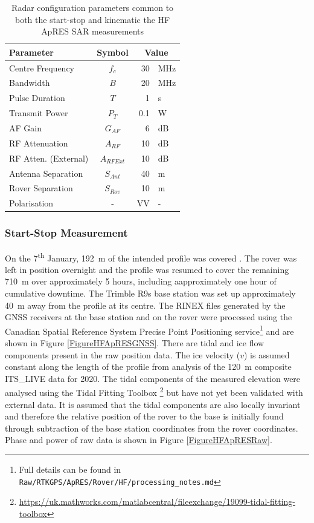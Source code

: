 \documentclass[a4paper,12pt]{article}
\begin{document}
\begin{table}[h]
  \centering\begin{tabular}{l c r l}
    \hline
    \rowcolor{gray!50}
    Parameter & Symbol & \multicolumn{2}{c}{Value} \\
    \hline
    Centre Frequency & $f_c$ & 30 & \si{\mega\hertz} \\
    Bandwidth & $B$ & 20 & \si{\mega\hertz} \\
    Pulse Duration & $T$ & 1 & \si{\second} \\
    Transmit Power & $P_T$ & 0.1 & \si{\watt} \\
    AF Gain & $G_{AF}$ & 6 & \si{\deci\bel} \\
    RF Attenuation & $A_{RF}$ & 10 & \si{\deci\bel} \\
    RF Atten. (External) & $A_{RFExt}$ & 10 &  \si{\deci\bel} \\
    Antenna Separation & $S_{Ant}$ & 40 & \si{\metre} \\
    Rover Separation & $S_{Rov}$ & 10 & \si{\metre} \\
    Polarisation & - & VV & - \\
    \hline
    
  \end{tabular}
  \caption{Radar configuration parameters common to both the start-stop and
  kinematic the HF ApRES SAR measurements}
  \label{TableHFApRESMeasurementParams}
\end{table}

\subsubsection{Start-Stop Measurement}
On the 7\textsuperscript{th} January, \SI{192}{\metre} of the intended profile
was covered .  The rover was left in position overnight and the profile was
resumed to cover the remaining \SI{710}{\metre} over approximately 5 hours,
including aapproximately one hour of cumulative downtime. The Trimble R9s base
station was set up approximately \SI{40}{\metre} away from the profile at its
centre.  The RINEX files generated by the GNSS receivers at the base station and
on the rover were processed using the Canadian Spatial Reference System Precise
Point Positioning service\footnote{Full details can be found in
\texttt{Raw/RTKGPS/ApRES/Rover/HF/processing\_notes.md}} and are shown in Figure 
\ref{FigureHFApRESGNSS}.  There are tidal and ice flow components present in the
raw position data.  The ice velocity ($v$) is assumed constant along the length
of the profile from analysis of the \SI{120}{\metre} composite ITS\_LIVE data
for 2020.  The tidal components of the measured elevation were analysed using
the Tidal Fitting Toolbox \footnote{\url{https://uk.mathworks.com/matlabcentral/fileexchange/19099-tidal-fitting-toolbox}}
but have not yet been validated with external data.  It is assumed that the
tidal components are also locally invariant and therefore the relative position
of the rover to the base is initially found through subtraction of the base
station coordinates from the rover coordinates. Phase and power of raw data is 
shown in Figure \ref{FigureHFApRESRaw}.
\end{document}
